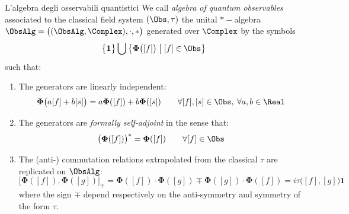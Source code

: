 \documentclass[8pt,handout]{beamer}
\begin{document}
	\begin{frame}{L'algebra degli osservabili quantistici}
			We call \emph{algebra of quantum observables} associated to the classical field system $(\Obs, \tau)$ the unital $\ast-$algebra 
			$	\ObsAlg	= \big( (\ObsAlg, \Complex),\cdot,*\big)$ generated over $\Complex$ by the symbols 
			\begin{displaymath}
				\big\{\mathbf{1}\big\}\bigcup \big\{\mathbf{\Phi}\big( [f]\big) \; \big\vert \;  [f] \in \Obs \big\}
			\end{displaymath}
			such that:
			\begin{enumerate}
				\item The generators are linearly independent:
					\begin{equation}\label{Ip:GenIndip}
						\mathbf{\Phi} \big(a [f] + b [s] \big) = 
						a \mathbf{\Phi} ([f]) + b \mathbf{\Phi} ([s]) \qquad \forall [f],[s] \in \Obs,\: \forall a,b \in \Real
					\end{equation}
				\item The generators are \emph{formally self-adjoint} in the sense that:
					\begin{equation}\label{Ip:GenSelfAd}
						\big( \mathbf{\Phi}([f]) \big)^* = \mathbf{\Phi}([f]) \qquad \forall [f] \in \Obs
					\end{equation}
				\item The (anti-) commutation relations extrapolated from %
					the classical $\tau$ are replicated on $\ObsAlg$:
					\begin{equation}\label{Ip:ImplementCCR}
						\big[ \mathbf{\Phi}([f]), \mathbf{\Phi}([g]) \big]_\mp = \mathbf{\Phi}([f]) \cdot \mathbf{\Phi}([g]) \mp \mathbf{\Phi}([g]) \cdot \mathbf{\Phi}([f]) = i \tau\big( [f], [g] \big) \mathbf{1}
					\end{equation}
					where the sign $\mp$ depend respectively on the anti-symmetry and symmetry of the form $\tau$.
			\end{enumerate}
	\end{frame}
	
\end{document}
